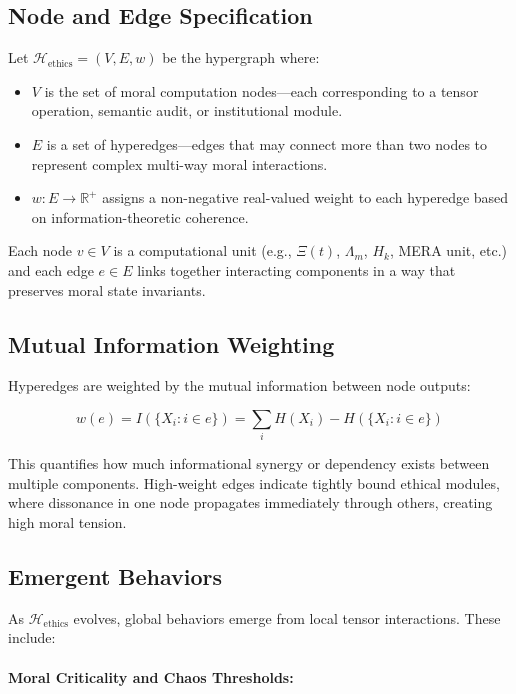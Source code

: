 \documentclass{article}
\theoremstyle{plain}
\theoremstyle{claimstyle}
\begin{document}
\subsection{Node and Edge Specification}

Let \(\mathcal{H}_{\text{ethics}} = (V, E, w)\) be the hypergraph where:

\begin{itemize}
    \item \(V\) is the set of moral computation nodes—each corresponding to a tensor operation, semantic audit, or institutional module.
    \item \(E\) is a set of hyperedges—edges that may connect more than two nodes to represent complex multi-way moral interactions.
    \item \(w: E \rightarrow \mathbb{R}^+\) assigns a non-negative real-valued weight to each hyperedge based on information-theoretic coherence.
\end{itemize}

Each node \(v \in V\) is a computational unit (e.g., \(\Xi(t)\), \(\Lambda_m\), \(H_k\), MERA unit, etc.) and each edge \(e \in E\) links together interacting components in a way that preserves moral state invariants.

\subsection{Mutual Information Weighting}

Hyperedges are weighted by the mutual information between node outputs:

\[
w(e) = I(\{X_i : i \in e\}) = \sum_{i} H(X_i) - H(\{X_i : i \in e\})
\]

This quantifies how much informational synergy or dependency exists between multiple components. High-weight edges indicate tightly bound ethical modules, where dissonance in one node propagates immediately through others, creating high moral tension.

\subsection{Emergent Behaviors}

As \(\mathcal{H}_{\text{ethics}}\) evolves, global behaviors emerge from local tensor interactions. These include:

\paragraph{Moral Criticality and Chaos Thresholds:}
\end{document}
